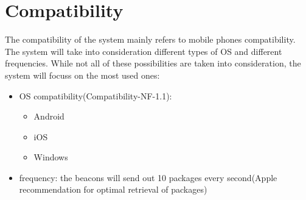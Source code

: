 \section{Compatibility}
The compatibility of the system mainly refers to mobile phones compatibility. The system will take into consideration different types of OS and different frequencies. While not all of these possibilities are taken into consideration, the system will focuss on the most used ones:

\begin{itemize}
	\item OS compatibility(Compatibility-NF-1.1):
	\begin{itemize}
		\item Android
		\item iOS
		\item Windows
	\end{itemize}
	\item frequency: the beacons will send out 10 packages every second(Apple recommendation for optimal retrieval of packages\cite{web:beacons})
\end{itemize}

